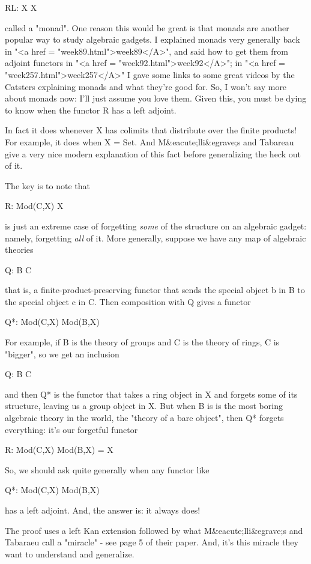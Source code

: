 RL: X \to  X

called a "monad".  One reason this would be great is that
monads are another popular way to study algebraic
gadgets.  I explained monads very generally back in "<a href =
"week89.html">week89</A>", and said how to get them from adjoint
functors in "<a href = "week92.html">week92</A>"; in
"<a href = "week257.html">week257</A>" I gave some links to
some great videos by the Catsters explaining monads and what they're
good for.  So, I won't say more about monads now: I'll just assume you
love them.  Given this, you must be dying to know when the functor R
has a left adjoint.

In fact it does whenever X has colimits that distribute over the
finite products!  For example, it does when X = Set.  And M&eacute;lli&egrave;s and
Tabareau give a very nice modern explanation of this fact before
generalizing the heck out of it.

The key is to note that 

R: Mod(C,X) \to  X

is just an extreme case of forgetting \emph{some} of the structure on an
algebraic gadget: namely, forgetting \emph{all} of it.  More generally, 
suppose we have any map of algebraic theories

Q: B \to  C

that is, a finite-product-preserving functor that sends the special
object b in B to the special object c in C.   Then composition with
Q gives a functor

Q*: Mod(C,X) \to  Mod(B,X)

For example, if B is the theory of groups and C is the theory of rings,
C is "bigger", so we get an inclusion

Q: B \to  C

and then Q* is the functor that takes a ring object in X and forgets
some of its structure, leaving us a group object in X.  But when B is 
is the most boring algebraic theory in the world, the "theory
of a bare object", then Q* forgets everything: it's our forgetful functor

R: Mod(C,X) \to  Mod(B,X) = X

So, we should ask quite generally when any functor like

Q*: Mod(C,X) \to  Mod(B,X)

has a left adjoint.  And, the answer is: it always does!  

The proof uses a left Kan extension followed by what M&eacute;lli&egrave;s and
Tabaraeu call a "miracle" - see page 5 of their paper.  And, it's
this miracle they want to understand and generalize.  

